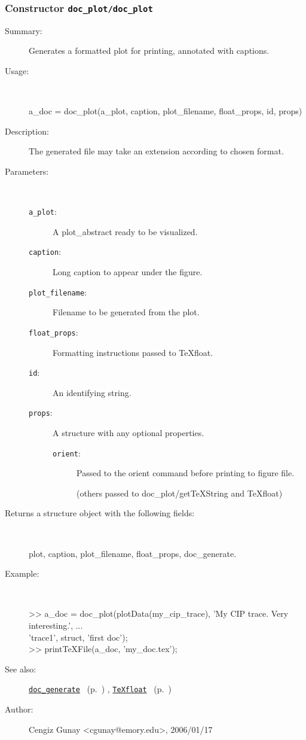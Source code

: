 \subsubsection[Constructor \texttt{doc\_plot}]{Constructor \texttt{doc\_plot/doc\_plot}}%
%
\label{ref_doc_plot__doc_plot}%
\hypertarget{ref_doc_plot__doc_plot}{}%
\begin{description}
\item[Summary:]Generates a formatted plot for printing, annotated with captions.
%
\item[Usage:]~%
\begin{lyxcode}%
a\_doc = doc\_plot(a\_plot, caption, plot\_filename, float\_props, id, props)
%
\end{lyxcode}%
%
\item[Description:]%
The generated file may take an extension according to chosen format.
\item[Parameters:]~
\begin{description}%
\item[\texttt{a\_plot}:]
 A plot\_abstract ready to be visualized.
\item[\texttt{caption}:]
 Long caption to appear under the figure.
\item[\texttt{plot\_filename}:]
  Filename to be generated from the plot.
\item[\texttt{float\_props}:]
 Formatting instructions passed to TeXfloat. 
\item[\texttt{id}:]
 An identifying string.
\item[\texttt{props}:]
 A structure with any optional properties.
\begin{description}%
\item[\texttt{orient}:]
 Passed to the orient command before printing to figure file.

(others passed to doc\_plot/getTeXString and TeXfloat)
\end{description}%
\end{description}%
%
\item[Returns a structure object with the following fields:
]~

	plot, caption, plot\_filename, float\_props, doc\_generate.
%
\item[Example:]~
\begin{lyxcode}   >> a\_doc = doc\_plot(plotData(my\_cip\_trace), 'My CIP trace. Very interesting.', ...
\\%
                       'trace1', struct, 'first doc');
\\%
   >> printTeXFile(a\_doc, 'my\_doc.tex'); %
\\%
\end{lyxcode}
%
\item[See also:]%
\hyperlink{ref_doc_generate}{\texttt{doc\_generate}}%
\ (p.~\pageref{ref_doc_generate})%
%
, \hyperlink{ref_TeXfloat}{\texttt{TeXfloat}}%
\ (p.~\pageref{ref_TeXfloat})%
%
%
\item[Author:]%
Cengiz Gunay <cgunay@emory.edu>, 2006/01/17
%
\end{description}
\methodline%
